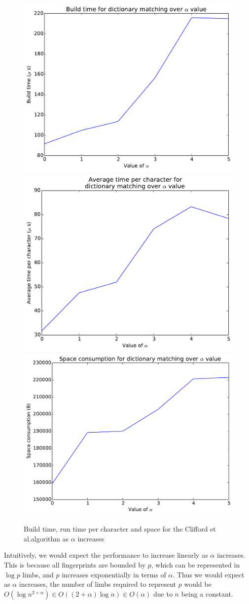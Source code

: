 \documentclass[ %
                    author={Dominic Joseph Moylett},
                    degree={MEng},
                     title={Dictionary Matching with Fingerprints},
                  subtitle={An Empirical Analysis},
                      type={research},
                      year={2015} ]{dissertation}
\begin{document}
\begin{figure}[t]
\begin{center}
  \includegraphics[width=0.5\linewidth]{build_alpha}\\
  \includegraphics[width=0.5\linewidth]{time_alpha}\includegraphics[width=0.5\linewidth]{size_alpha}
\end{center}
\caption{Build time, run time per character and space for the Clifford et al.\@ algorithm as $\alpha$ increases}
\label{fig:alpha-results}
\end{figure}

Intuitively, we would expect the performance to increase linearly as $\alpha$ increases. This is because all fingerprints are bounded by $p$, which can be represented in $\log p$ limbs, and $p$ increases exponentially in terms of $\alpha$. Thus we would expect as $\alpha$ increases, the number of limbs required to represent $p$ would be $O(\log n^{2 + \alpha}) \in O((2 + \alpha)\log n) \in O(\alpha)$ due to $n$ being a constant.
\end{document}
